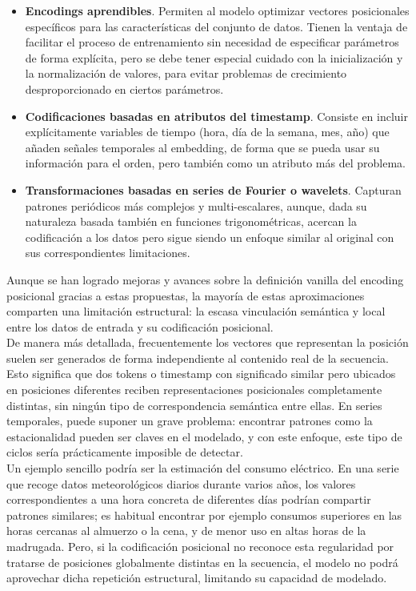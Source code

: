 \begin{itemize}
    \item \textbf{Encodings aprendibles}. Permiten al modelo optimizar vectores posicionales específicos para las características del conjunto de datos. Tienen la ventaja de facilitar el proceso de entrenamiento sin necesidad de especificar parámetros de forma explícita, pero se debe tener especial cuidado con la inicialización y la normalización de valores, para evitar problemas de crecimiento desproporcionado en ciertos parámetros.
    \item \textbf{Codificaciones basadas en atributos del timestamp}. Consiste en incluir explícitamente variables de tiempo (hora, día de la semana, mes, año) que añaden señales temporales al embedding, de forma que se pueda usar su información para el orden, pero también como un atributo más del problema.
    \item \textbf{Transformaciones basadas en series de Fourier o wavelets}. Capturan patrones periódicos más complejos y multi-escalares, aunque, dada su naturaleza basada también en funciones trigonométricas, acercan la codificación a los datos pero sigue siendo un enfoque similar al original con sus correspondientes limitaciones.
\end{itemize}

Aunque se han logrado mejoras y avances sobre la definición vanilla del encoding posicional gracias a estas propuestas, la mayoría de estas aproximaciones comparten una limitación estructural: la escasa vinculación semántica y local entre los datos de entrada y su codificación posicional.\\

De manera más detallada, frecuentemente los vectores que representan la posición suelen ser generados de forma independiente al contenido real de la secuencia. Esto significa que dos tokens o timestamp con significado similar pero ubicados en posiciones diferentes reciben representaciones posicionales completamente distintas, sin ningún tipo de correspondencia semántica entre ellas. En series temporales, puede suponer un grave problema: encontrar patrones como la estacionalidad pueden ser claves en el modelado, y con este enfoque, este tipo de ciclos sería prácticamente imposible de detectar.\\

Un ejemplo sencillo podría ser la estimación del consumo eléctrico. En una serie que recoge datos meteorológicos diarios durante varios años, los valores correspondientes a una hora concreta de diferentes días podrían compartir patrones similares; es habitual encontrar por ejemplo consumos superiores en las horas cercanas al almuerzo o la cena, y de menor uso en altas horas de la madrugada. Pero, si la codificación posicional no reconoce esta regularidad por tratarse de posiciones globalmente distintas en la secuencia, el modelo no podrá aprovechar dicha repetición estructural, limitando su capacidad de modelado.\\

